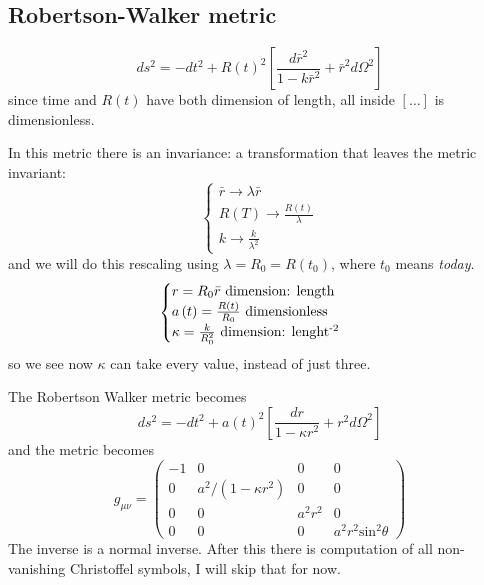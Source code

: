 \subsection{Robertson-Walker metric}
\[
	ds^{2} = -dt^{2} + R\left( t \right)^{2}\left[ \frac{d\bar{r}^{2}}{1 - k \bar{r}^{2}} + \bar{r}^{2}d\Omega ^{2} \right]
\]
since time and $R\left( t \right)$ have both dimension of length, all inside $\left[ \ldots  \right]$ is dimensionless.\par
In this metric there is an invariance: a transformation that leaves the metric invariant:
\[
\begin{cases}
	\bar{r} \to \lambda \bar{r} \\
R\left( T \right) \to \frac{R\left( t \right)}{\lambda } \\
k \to  \frac{k}{\lambda ^{2}}
\end{cases}
\]
and we will do this rescaling using $\lambda = R_{0} = R\left( t_{0} \right)$, where $t_{0}$ means \emph{today}.
\[
\begin{cases}
	r = R_{0}\bar{r}  \text{ dimension: length }\\	
a\left( t \right) = \frac{R\left( t \right)}{R_{0}} \text{ dimensionless }\\
\kappa = \frac{k}{R_{0}^{2}} \text{ dimension: lenght\textsuperscript{-2} }
\end{cases}
\]
so we see now $\kappa $ can take every value, instead of just three.\par
The Robertson Walker metric becomes
\[
ds^{2} = -dt^{2} + a\left( t \right)^{2}\left[ \frac{dr}{1- \kappa r^{2}} + r^{2} d\Omega ^{2} \right]
\]
and the metric becomes
\[
g_{\mu \nu  } = \begin{pmatrix}
-1 & 0 & 0 & 0 \\
0 & a^{2}/\left( 1- \kappa r^{2} \right) & 0 & 0 \\
0 & 0 & a^{2}r^{2} & 0 \\
0 & 0 & 0 & a^{2}r^{2}\text{sin}^{2}\theta 
\end{pmatrix} 
\]
The inverse is a normal inverse. After this there is computation of all non-vanishing Christoffel symbols, I will skip that for now.














